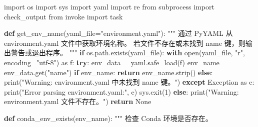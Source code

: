 \documentclass[
  letterpaper,
  DIV=11,
  numbers=noendperiod]{scrreprt}
\newenvironment{Shaded}{\begin{snugshade}}{\end{snugshade}}
\newcommand{\BuiltInTok}[1]{\textcolor[rgb]{0.00,0.23,0.31}{#1}}
\newcommand{\CommentTok}[1]{\textcolor[rgb]{0.37,0.37,0.37}{#1}}
\newcommand{\ControlFlowTok}[1]{\textcolor[rgb]{0.00,0.23,0.31}{\textbf{#1}}}
\newcommand{\DecValTok}[1]{\textcolor[rgb]{0.68,0.00,0.00}{#1}}
\newcommand{\ImportTok}[1]{\textcolor[rgb]{0.00,0.46,0.62}{#1}}
\newcommand{\KeywordTok}[1]{\textcolor[rgb]{0.00,0.23,0.31}{\textbf{#1}}}
\newcommand{\NormalTok}[1]{\textcolor[rgb]{0.00,0.23,0.31}{#1}}
\newcommand{\OperatorTok}[1]{\textcolor[rgb]{0.37,0.37,0.37}{#1}}
\newcommand{\PreprocessorTok}[1]{\textcolor[rgb]{0.68,0.00,0.00}{#1}}
\newcommand{\StringTok}[1]{\textcolor[rgb]{0.13,0.47,0.30}{#1}}
\newcommand{\VariableTok}[1]{\textcolor[rgb]{0.07,0.07,0.07}{#1}}
\begin{document}
\begin{Shaded}
\begin{Highlighting}[]
\ImportTok{import}\NormalTok{ os}
\ImportTok{import}\NormalTok{ sys}
\ImportTok{import}\NormalTok{ yaml}
\ImportTok{import}\NormalTok{ re}
\ImportTok{from}\NormalTok{ subprocess }\ImportTok{import}\NormalTok{ check\_output}
\ImportTok{from}\NormalTok{ invoke }\ImportTok{import}\NormalTok{ task}

\KeywordTok{def}\NormalTok{ get\_env\_name(yaml\_file}\OperatorTok{=}\StringTok{"environment.yaml"}\NormalTok{):}
    \CommentTok{"""}
\CommentTok{    通过 PyYAML 从 environment.yaml 文件中获取环境名称。}
\CommentTok{    若文件不存在或未找到 \textquotesingle{}name\textquotesingle{} 键，则输出警告或退出程序。}
\CommentTok{    """}
    \ControlFlowTok{if}\NormalTok{ os.path.exists(yaml\_file):}
        \ControlFlowTok{with} \BuiltInTok{open}\NormalTok{(yaml\_file, }\StringTok{"r"}\NormalTok{, encoding}\OperatorTok{=}\StringTok{"utf{-}8"}\NormalTok{) }\ImportTok{as}\NormalTok{ f:}
            \ControlFlowTok{try}\NormalTok{:}
\NormalTok{                env\_data }\OperatorTok{=}\NormalTok{ yaml.safe\_load(f)}
\NormalTok{                env\_name }\OperatorTok{=}\NormalTok{ env\_data.get(}\StringTok{"name"}\NormalTok{)}
                \ControlFlowTok{if}\NormalTok{ env\_name:}
                    \ControlFlowTok{return}\NormalTok{ env\_name.strip()}
                \ControlFlowTok{else}\NormalTok{:}
                    \BuiltInTok{print}\NormalTok{(}\StringTok{"Warning: environment.yaml 中未找到 \textquotesingle{}name\textquotesingle{} 键。"}\NormalTok{)}
            \ControlFlowTok{except} \PreprocessorTok{Exception} \ImportTok{as}\NormalTok{ e:}
                \BuiltInTok{print}\NormalTok{(}\StringTok{"Error parsing environment.yaml:"}\NormalTok{, e)}
\NormalTok{                sys.exit(}\DecValTok{1}\NormalTok{)}
    \ControlFlowTok{else}\NormalTok{:}
        \BuiltInTok{print}\NormalTok{(}\StringTok{"Warning: environment.yaml 文件不存在。"}\NormalTok{)}
    \ControlFlowTok{return} \VariableTok{None}

\KeywordTok{def}\NormalTok{ conda\_env\_exists(env\_name):}
    \CommentTok{"""}
\CommentTok{    检查 Conda 环境是否存在。}


\end{Highlighting}
\end{Shaded}
\end{document}
